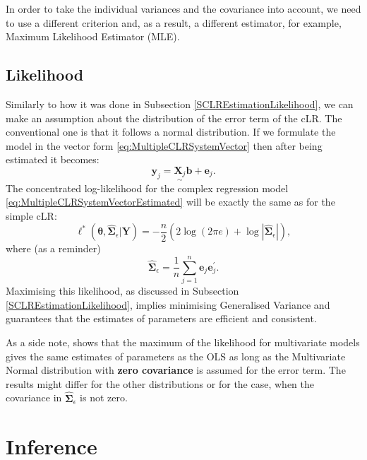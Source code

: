 \documentclass[
]{book}
\begin{document}
In order to take the individual variances and the covariance into account, we need to use a different criterion and, as a result, a different estimator, for example, Maximum Likelihood Estimator (MLE).

\hypertarget{likelihood}{%
\subsection{Likelihood}\label{likelihood}}

Similarly to how it was done in Subsection \ref{SCLREstimationLikelihood}, we can make an assumption about the distribution of the error term of the cLR. The conventional one is that it follows a normal distribution. If we formulate the model in the vector form \eqref{eq:MultipleCLRSystemVector} then after being estimated it becomes:
\begin{equation}
    \mathbf{y}_j = \underset{\sim}{\mathbf{X}_j} \boldsymbol{b} + \boldsymbol{e}_j .
    \label{eq:MultipleCLRSystemVectorEstimated}
\end{equation}
The concentrated log-likelihood for the complex regression model \eqref{eq:MultipleCLRSystemVectorEstimated} will be exactly the same as for the simple cLR:
\begin{equation*}
    \ell^*(\boldsymbol{\theta}, \hat{\boldsymbol{\Sigma}}_\epsilon | \mathbf{Y}) = -\frac{n}{2} \left( 2 \log(2 \pi e) + \log | \hat{\boldsymbol{\Sigma}}_\epsilon | \right) ,
\end{equation*}
where (as a reminder)
\begin{equation*}
    \hat{\boldsymbol{\Sigma}}_\epsilon = \frac{1}{n} \sum_{j=1}^{n} \boldsymbol{e}_j \boldsymbol{e}_j^\prime .
\end{equation*}
Maximising this likelihood, as discussed in Subsection \ref{SCLREstimationLikelihood}, implies minimising Generalised Variance and guarantees that the estimates of parameters are efficient and consistent.

As a side note, \citet{Lutkepohl2005} shows that the maximum of the likelihood for multivariate models gives the same estimates of parameters as the OLS as long as the Multivariate Normal distribution with \textbf{zero covariance} is assumed for the error term. The results might differ for the other distributions or for the case, when the covariance in \(\hat{\boldsymbol{\Sigma}}_\epsilon\) is not zero.

\hypertarget{MCLRInference}{%
\section{Inference}\label{MCLRInference}}
\end{document}
